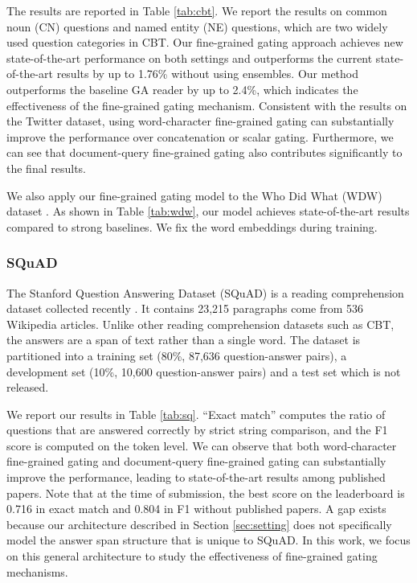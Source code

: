 \documentclass{article} \usepackage{iclr2017_conference,times}
\begin{document}
The results are reported in Table \ref{tab:cbt}. We report the results on common noun (CN) questions and named entity (NE) questions, which are two widely used question categories in CBT. Our fine-grained gating approach achieves new state-of-the-art performance on both settings and outperforms the current state-of-the-art results by up to 1.76\% without using ensembles. Our method outperforms the baseline GA reader by up to 2.4\%, which indicates the effectiveness of the fine-grained gating mechanism. Consistent with the results on the Twitter dataset, using word-character fine-grained gating can substantially improve the performance over concatenation or scalar gating. Furthermore, we can see that document-query fine-grained gating also contributes significantly to the final results.

We also apply our fine-grained gating model to the Who Did What (WDW) dataset \citep{onishi2016did}. As shown in Table \ref{tab:wdw}, our model achieves state-of-the-art results compared to strong baselines. We fix the word embeddings during training.

\subsubsection{SQuAD}

The Stanford Question Answering Dataset (SQuAD) is a reading comprehension dataset collected recently \citep{pranav2016squad}. It contains 23,215 paragraphs come from 536 Wikipedia articles.
Unlike other reading comprehension datasets such as CBT, the answers are a span of text rather than a single word.
The dataset is partitioned into a training set (80\%, 87,636 question-answer pairs), a development set (10\%, 10,600 question-answer pairs) and a test set which is not released.


We report our results in Table \ref{tab:sq}. ``Exact match'' computes the ratio of questions that are answered correctly by strict string comparison, and the F1 score is computed on the token level. We can observe that both word-character fine-grained gating and document-query fine-grained gating can substantially improve the performance, leading to state-of-the-art results among published papers. Note that at the time of submission, the best score on the leaderboard is 0.716 in exact match and 0.804 in F1 without published papers. A gap exists because our architecture described in Section \ref{sec:setting} does not specifically model the answer span structure that is unique to SQuAD.
In this work, we focus on this general architecture to study the effectiveness of fine-grained gating mechanisms.
\end{document}
